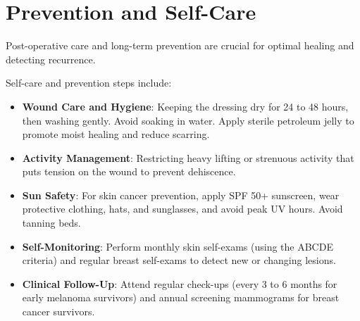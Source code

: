 \section*{Prevention and Self-Care}
Post-operative care and long-term prevention are crucial for optimal healing and detecting recurrence.

Self-care and prevention steps include:
\begin{itemize}
    \item \textbf{Wound Care and Hygiene}: Keeping the dressing dry for 24 to 48 hours, then washing gently. Avoid soaking in water. Apply sterile petroleum jelly to promote moist healing and reduce scarring.
    \item \textbf{Activity Management}: Restricting heavy lifting or strenuous activity that puts tension on the wound to prevent dehiscence.
    \item \textbf{Sun Safety}: For skin cancer prevention, apply SPF 50+ sunscreen, wear protective clothing, hats, and sunglasses, and avoid peak UV hours. Avoid tanning beds.
    \item \textbf{Self-Monitoring}: Perform monthly skin self-exams (using the ABCDE criteria) and regular breast self-exams to detect new or changing lesions.
    \item \textbf{Clinical Follow-Up}: Attend regular check-ups (every 3 to 6 months for early melanoma survivors) and annual screening mammograms for breast cancer survivors.
\end{itemize}

